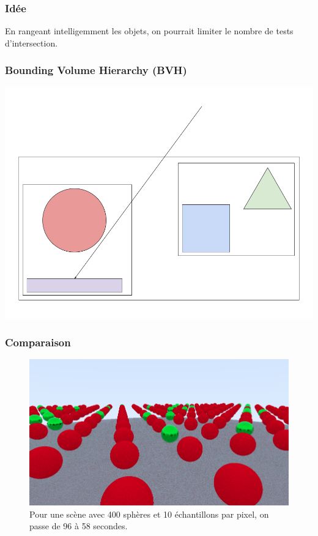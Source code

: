 \documentclass[handout]{beamer}
\begin{document}
\begin{frame}
    \frametitle{Idée}
    En rangeant intelligemment les objets, on pourrait limiter le nombre de tests d'intersection.
\end{frame}

\begin{frame}
    \frametitle{Bounding Volume Hierarchy (BVH)}
    \includegraphics[scale=0.3]{Arbre.png}
\end{frame}

\begin{frame}
    \frametitle{Comparaison}

    \begin{figure}
        \includegraphics[scale=0.2]{bvh.png}
        \caption{Pour une scène avec 400 sphères et 10 échantillons par pixel, on passe de 96 à 58 secondes.}
    \end{figure}

\end{frame}
\end{document}
